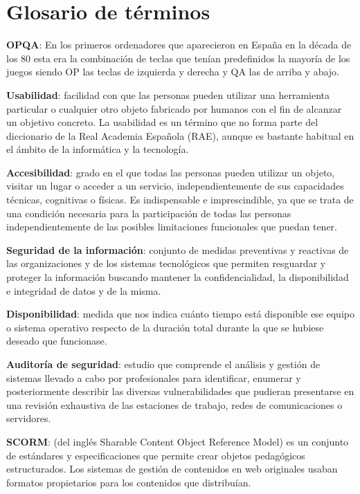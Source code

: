 \chapter{Glosario de términos}


\textbf{OPQA}: En los primeros ordenadores que aparecieron en España en la década de los 80 esta era la combinación de teclas que tenían predefinidos la mayoría de los juegos siendo OP las teclas de izquierda y derecha y QA las de arriba y abajo.
\bigskip

\textbf{Usabilidad}: facilidad con que las personas pueden utilizar una herramienta particular o cualquier otro objeto fabricado por humanos con el fin de alcanzar un objetivo concreto. La usabilidad es un término que no forma parte del diccionario de la Real Academia Española (RAE), aunque es bastante habitual en el ámbito de la informática y la tecnología.
\bigskip

\textbf{Accesibilidad}: grado en el que todas las personas pueden utilizar un objeto, visitar un lugar o acceder a un servicio, independientemente de sus capacidades técnicas, cognitivas o físicas. Es indispensable e imprescindible, ya que se trata de una condición necesaria para la participación de todas las personas independientemente de las posibles limitaciones funcionales que puedan tener.
\bigskip

\textbf{Seguridad de la información}: conjunto de medidas preventivas y reactivas de las organizaciones y de los sistemas tecnológicos que permiten resguardar y proteger la información buscando mantener la confidencialidad, la disponibilidad e integridad de datos y de la misma.
\bigskip

\textbf{Disponibilidad}: medida que nos indica cuánto tiempo está disponible ese equipo o sistema operativo respecto de la duración total durante la que se hubiese deseado que funcionase.
\bigskip

 \textbf{Auditoría de seguridad}: estudio que comprende el análisis y gestión de sistemas llevado a cabo por profesionales para identificar, enumerar y posteriormente describir las diversas vulnerabilidades que pudieran presentarse en una revisión exhaustiva de las estaciones de trabajo, redes de comunicaciones o servidores.
\bigskip

\textbf{SCORM}: (del inglés Sharable Content Object Reference Model) es un conjunto de estándares y especificaciones que permite crear objetos pedagógicos estructurados. Los sistemas de gestión de contenidos en web originales usaban formatos propietarios para los contenidos que distribuían.
\bigskip

